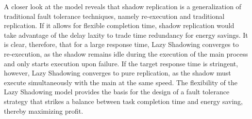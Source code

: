 A closer look at the model reveals that shadow
replication is a generalization of traditional fault tolerance
techniques, namely re-execution and traditional replication. If it allows for flexible completion time, shadow
replication would take advantage of the delay laxity to trade time
redundancy for energy savings. It is clear, therefore, that for a
large response time, Lazy Shadowing converges to re-execution, as
the shadow remains idle during the execution of the main process and
only starts execution upon failure. If the target response time is
stringent, however, Lazy Shadowing converges to pure replication,
as the shadow must execute simultaneously with the main at the same
speed. The flexibility of the Lazy Shadowing model provides the
basis for the design of a fault tolerance strategy that strikes a
balance between task completion time and energy saving, thereby
maximizing profit.




